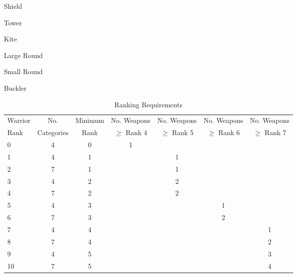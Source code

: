 \begin{table*}[h]
\begin{minipage}{\linewidth}
\begin{multicols}{4}
\begin{Enumerate}
\item Shield
\begin{Itemize}
\item Tower
\item Kite
\item Large Round
\item Small Round
\item Buckler
\end{Itemize}
\end{Enumerate}

\end{multicols}
\end{minipage}
\end{table*}

\begin{table*}[h]
\begin{center}
\begin{tabular}{|l|c|c|c|c|c|c|} \hline
Warrior	& No.		& Minimum& No. Weapons & No. Weapons & No. Weapons & No. Weapons \\
Rank	& Categories	& Rank	&  $\geq$ Rank 4 & $\geq$ Rank 5 & $\geq$ Rank 6 & $\geq$ Rank 7 \\ \hline
0	& 4		& 0	& 1	& 	& 	& \\
1	& 4		& 1	&	& 1	& 	& \\
2	& 7		& 1	& 	& 1	& 	& \\
3	& 4		& 2	&	& 2	&	& \\
4	& 7		& 2	&	& 2	&	& \\
5	& 4		& 3	&	&	& 1	& \\
6	& 7		& 3	&	&	& 2	& \\
7	& 4		& 4	&	&	&	& 1 \\
8	& 7		& 4	& 	&	& 	& 2 \\
9	& 4		& 5	&	&	&	& 3 \\
10	& 7		& 5	&	&	&	& 4 \\ \hline
\end{tabular}
\end{center}
\caption{Ranking Requirements}
\end{table*}
\newpage
